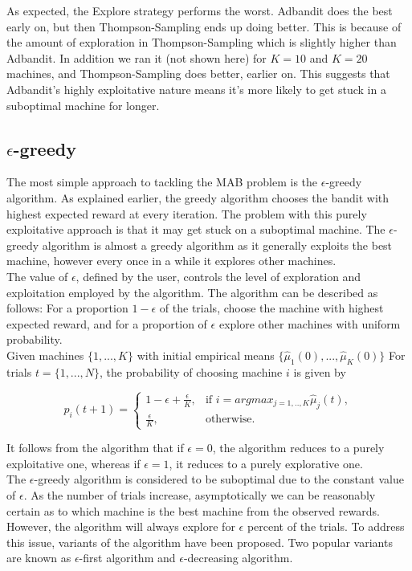 \documentclass{article}
\begin{document}
As expected, the Explore strategy performs the worst. Adbandit does the best early on, but then Thompson-Sampling ends up doing better. This is because of the amount of exploration in Thompson-Sampling which is slightly higher than Adbandit. In addition we ran it (not shown here) for $K=10$ and $K=20$ machines, and Thompson-Sampling does better, earlier on. This suggests that Adbandit's highly exploitative nature means it's more likely to get stuck in a suboptimal machine for longer.

\subsection{$\epsilon$-greedy}

The most simple approach to tackling the MAB problem is the $\epsilon$-greedy algorithm. As explained earlier, the greedy algorithm chooses the bandit with highest expected reward at every iteration. The problem with this purely exploitative approach is that it may get stuck on a suboptimal machine. The $\epsilon$-greedy algorithm is almost a greedy algorithm as it generally exploits the best machine, however every once in a while it explores other machines.\\ 

The value of $\epsilon$, defined by the user, controls the level of exploration and exploitation employed by the algorithm. The algorithm can be described as follows: For a proportion $1 - \epsilon$ of the trials, choose the machine with highest expected reward, and for a proportion of $\epsilon$ explore other machines with uniform probability.\\

Given machines $\{1,...,K\}$ with initial empirical means $\{\hat{\mu}_1(0),...,\hat{\mu}_K(0)\}$ For trials $t = \{1,...,N\}$, the probability of choosing machine $i$ is given by

$$p_i(t+1) = \begin{cases}
  1- \epsilon + \frac{\epsilon}{K}, & \text{if } i = argmax_{j=1,..,K}\hat{\mu}_j(t), \\
  \frac{\epsilon}{K}, & \text{otherwise}.
\end{cases}$$


It follows from the algorithm that if $\epsilon = 0$, the algorithm reduces to a purely exploitative one, whereas if $\epsilon = 1$, it reduces to a purely explorative one. \\

The $\epsilon$-greedy algorithm is considered to be suboptimal due to the constant value of $\epsilon$. As the number of trials increase, asymptotically we can be reasonably certain as to which machine is the best machine from the observed rewards. However, the algorithm will always explore for $\epsilon$ percent of the trials. To address this issue, variants of the algorithm have been proposed. Two popular variants are known as $\epsilon$-first algorithm and $\epsilon$-decreasing algorithm.\\
\end{document}
